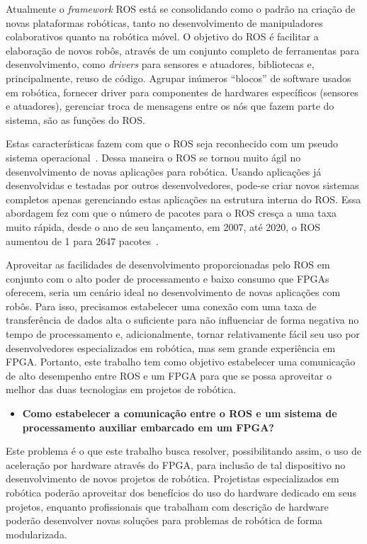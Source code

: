 Atualmente o \textit{framework} ROS está se consolidando como o padrão na criação de novas plataformas robóticas, tanto no desenvolvimento de manipuladores colaborativos quanto na robótica móvel. O objetivo do ROS é facilitar a elaboração de novos robôs, através de um conjunto completo de ferramentas para desenvolvimento, como \textit{drivers} para sensores e atuadores, bibliotecas e, principalmente, reuso de código. Agrupar inúmeros ``blocos'' de software usados em robótica, fornecer driver para componentes de hardwares específicos (sensores e atuadores), gerenciar troca de mensagens entre os nós que fazem parte do sistema, são as funções do ROS\@. 

Estas características fazem com que o ROS seja reconhecido com um pseudo sistema operacional~\cite{rosPYO}. Dessa maneira o ROS se tornou muito ágil no desenvolvimento de novas aplicações para robótica. Usando aplicações já desenvolvidas e testadas por outros desenvolvedores, pode-se criar novos sistemas completos apenas gerenciando estas aplicações na estrutura interna do ROS\@. Essa abordagem fez com que o número de pacotes para o ROS cresça a uma taxa muito rápida, desde o ano de seu lançamento, em 2007, até 2020, o ROS aumentou de 1 para 2647 pacotes~\cite{ecosystemros}.

Aproveitar as facilidades de desenvolvimento proporcionadas pelo ROS em conjunto com o alto poder de processamento e baixo consumo que FPGAs oferecem, seria um cenário ideal no desenvolvimento de novas aplicações com robôs. Para isso, precisamos estabelecer uma conexão com uma taxa de transferência de dados alta o suficiente para não influenciar de forma negativa no tempo de processamento e, adicionalmente, tornar relativamente fácil seu uso por desenvolvedores especializados em robótica, mas sem grande experiência em FPGA\@. Portanto, este trabalho tem como objetivo estabelecer uma comunicação de alto desempenho entre ROS e um FPGA para que se possa aproveitar o melhor das duas tecnologias em projetos de robótica. 

\begin{itemize}
    \item \textbf{Como estabelecer a comunicação entre o ROS e um sistema de processamento auxiliar 
embarcado em um FPGA?}

\end{itemize}

Este problema é o que este trabalho busca resolver, possibilitando assim, o uso de aceleração por hardware através do FPGA, para inclusão de tal dispositivo no desenvolvimento de novos projetos de robótica. Projetistas especializados em robótica poderão aproveitar dos benefícios do uso do hardware dedicado em seus projetos, enquanto profissionais que trabalham com descrição de hardware poderão desenvolver novas soluções para problemas de robótica de forma modularizada. 


